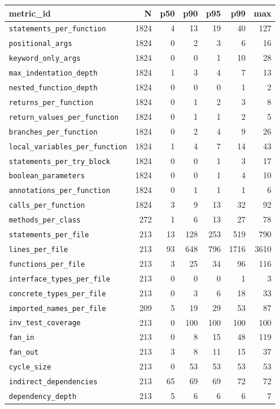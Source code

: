 \documentclass[11pt]{article}
\begin{document}
{\scriptsize
\begin{longtable}{@{}lrrrrrr@{}}
  \toprule
  metric\_id & N & p50 & p90 & p95 & p99 & max \\
  \midrule
  \endhead
  \texttt{statements\_per\_function} & 1824 & 4 & 13 & 19 & 40 & 127 \\
  \texttt{positional\_args} & 1824 & 0 & 2 & 3 & 6 & 16 \\
  \texttt{keyword\_only\_args} & 1824 & 0 & 0 & 1 & 10 & 28 \\
  \texttt{max\_indentation\_depth} & 1824 & 1 & 3 & 4 & 7 & 13 \\
  \texttt{nested\_function\_depth} & 1824 & 0 & 0 & 0 & 1 & 2 \\
  \texttt{returns\_per\_function} & 1824 & 0 & 1 & 2 & 3 & 8 \\
  \texttt{return\_values\_per\_function} & 1824 & 0 & 1 & 1 & 2 & 5 \\
  \texttt{branches\_per\_function} & 1824 & 0 & 2 & 4 & 9 & 26 \\
  \texttt{local\_variables\_per\_function} & 1824 & 1 & 4 & 7 & 14 & 43 \\
  \texttt{statements\_per\_try\_block} & 1824 & 0 & 0 & 1 & 3 & 17 \\
  \texttt{boolean\_parameters} & 1824 & 0 & 0 & 1 & 4 & 10 \\
  \texttt{annotations\_per\_function} & 1824 & 0 & 1 & 1 & 1 & 6 \\
  \texttt{calls\_per\_function} & 1824 & 3 & 9 & 13 & 32 & 92 \\
  \texttt{methods\_per\_class} & 272 & 1 & 6 & 13 & 27 & 78 \\
  \texttt{statements\_per\_file} & 213 & 13 & 128 & 253 & 519 & 790 \\
  \texttt{lines\_per\_file} & 213 & 93 & 648 & 796 & 1716 & 3610 \\
  \texttt{functions\_per\_file} & 213 & 3 & 25 & 34 & 96 & 116 \\
  \texttt{interface\_types\_per\_file} & 213 & 0 & 0 & 0 & 1 & 3 \\
  \texttt{concrete\_types\_per\_file} & 213 & 0 & 3 & 6 & 18 & 33 \\
  \texttt{imported\_names\_per\_file} & 209 & 5 & 19 & 29 & 53 & 87 \\
  \texttt{inv\_test\_coverage} & 213 & 0 & 100 & 100 & 100 & 100 \\
  \texttt{fan\_in} & 213 & 0 & 8 & 15 & 48 & 119 \\
  \texttt{fan\_out} & 213 & 3 & 8 & 11 & 15 & 37 \\
  \texttt{cycle\_size} & 213 & 0 & 53 & 53 & 53 & 53 \\
  \texttt{indirect\_dependencies} & 213 & 65 & 69 & 69 & 72 & 72 \\
  \texttt{dependency\_depth} & 213 & 5 & 6 & 6 & 6 & 7 \\
  \bottomrule
\end{longtable}
}
\end{document}
